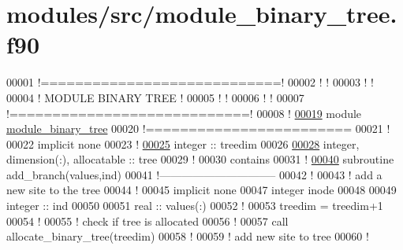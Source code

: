 \hypertarget{module__binary__tree_8f90_source}{
\section{modules/src/module\-\_\-binary\-\_\-tree.f90}
}

\begin{DoxyCode}
00001 \textcolor{comment}{!============================!}
00002 \textcolor{comment}{!                            !}
00003 \textcolor{comment}{!                            !}
00004 \textcolor{comment}{!     MODULE BINARY TREE     !}
00005 \textcolor{comment}{!                            !}
00006 \textcolor{comment}{!                            !}
00007 \textcolor{comment}{!============================!}
00008 \textcolor{comment}{!}
\hypertarget{module__binary__tree_8f90_source_l00019}{}\hyperlink{classmodule__binary__tree}{00019} \textcolor{keyword}{module} \hyperlink{classmodule__binary__tree}{module_binary_tree}
00020 \textcolor{comment}{!========================}
00021   \textcolor{comment}{!}
00022   \textcolor{keyword}{implicit none}
00023   \textcolor{comment}{!}
\hypertarget{module__binary__tree_8f90_source_l00025}{}\hyperlink{classmodule__binary__tree_a61c89527c6e2f4f499d86efd842c571a}{00025}   \textcolor{keywordtype}{integer} :: treedim
00026 
\hypertarget{module__binary__tree_8f90_source_l00028}{}\hyperlink{classmodule__binary__tree_a85d3e520ba717952e9c915f085fa2caf}{00028}   \textcolor{keywordtype}{integer}, \textcolor{keywordtype}{dimension(:)}, \textcolor{keywordtype}{allocatable} :: tree
00029   \textcolor{comment}{!}
00030 \textcolor{keyword}{contains}
00031   \textcolor{comment}{!}
\hypertarget{module__binary__tree_8f90_source_l00040}{}\hyperlink{classmodule__binary__tree_a9238e1484a74b966c0aabc0db55ab280}{00040}   \textcolor{keyword}{subroutine }add\_branch(values,ind)
00041   \textcolor{comment}{!--------------------------------}
00042     \textcolor{comment}{!}
00043     \textcolor{comment}{! add a new site to the tree}
00044     \textcolor{comment}{!}
00045     \textcolor{keyword}{implicit none}
00047     \textcolor{keywordtype}{integer} inode
00048 
00049     \textcolor{keywordtype}{integer} :: ind
00050 
00051     \textcolor{keywordtype}{real} :: values(:)
00052     \textcolor{comment}{!}
00053     treedim = treedim+1
00054     \textcolor{comment}{!}
00055     \textcolor{comment}{! check if tree is allocated}
00056     \textcolor{comment}{!}
00057     call allocate\_binary\_tree(treedim)
00058     \textcolor{comment}{!}
00059     \textcolor{comment}{! add new site to tree}
00060     \textcolor{comment}{!}

\end{DoxyCode}
